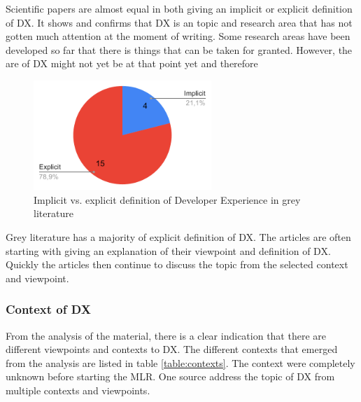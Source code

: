 \documentclass[english, 12pt, a4paper, sci, utf8, a-1b, online]{aaltothesis}
\begin{document}
Scientific papers are almost equal in both giving an implicit or explicit definition of DX. It shows and confirms that DX is an topic and research area that has not gotten much attention at the moment of writing. Some research areas have been developed so far that there is things that can be taken for granted. However, the are of DX might not yet be at that point yet and therefore

\begin{figure}[ht]
  \captionsetup{width=0.6\textwidth}
  \begin{center}
    \caption{Implicit vs. explicit definition of Developer Experience in grey literature}
    \includegraphics[width=0.6\textwidth]{definition-grey.pdf}
  \end{center}
\end{figure}

Grey literature has a majority of explicit definition of DX. The articles are often starting with giving an explanation of their viewpoint and definition of DX. Quickly the articles then continue to discuss the topic from the selected context and viewpoint.

\subsubsection{Context of DX}

From the analysis of the material, there is a clear indication that there are different viewpoints and contexts to DX. The different contexts that emerged from the analysis are listed in table \ref{table:contexts}. The context were completely unknown before starting the MLR. One source address the topic of DX from multiple contexts and viewpoints.
\end{document}
